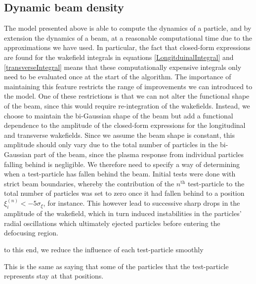 \subsection{Dynamic beam density}
The model presented above is able to compute the dynamics of a particle, and by extension the dynamics of a beam, at a reasonable computational time due to the approximations we have used. In particular, the fact that closed-form expressions are found for the wakefield integrals in equations \ref{LongitduinalIntegral} and \ref{transverseIntegral} means that these computationally expensive integrals only need to be evaluated once at the start of the algorithm. The importance of maintaining this feature restricts the range of improvements we can introduced to the model. One of these restrictions is that we can not alter the functional shape of the beam, since this would require re-integration of the wakefields. Instead, we choose to maintain the bi-Gaussian shape of the beam but add a functional dependence to the amplitude of the closed-form expressions for the longitudinal and transverse wakefields. Since we assume the beam shape is constant, this amplitude should only vary due to the total number of particles in the bi-Gaussian part of the beam, since the plasma response from individual particles falling behind is negligible. We therefore need to specify a way of determining when a test-particle has fallen behind the beam. Initial tests were done with strict beam boundaries, whereby the contribution of the $n^\text{th}$ test-particle to the total number of particles was set to zero once it had fallen behind to a position $\xi_{i}^{(n)}<-5\sigma_{\xi}$, for instance. This however lead to successive sharp drops in the amplitude of the wakefield, which in turn induced instabilities in the particles' radial oscillations which ultimately ejected particles before entering the defocusing region. 

to this end, we reduce the influence of each test-particle smoothly 

This is the same as saying that some of the particles that the test-particle represents stay at that positions.

